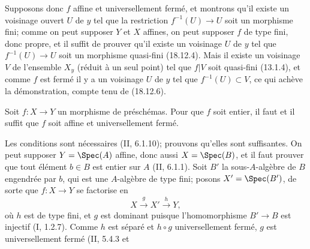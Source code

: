 Supposons donc $f$ affine et universellement fermé, et montrons qu'il existe un voisinage ouvert $U$ de $y$ tel que la restriction $f^{-1}(U)\to U$ soit un morphisme fini; comme on peut supposer $Y$ et $X$ affines, on peut supposer $f$ de type fini, donc propre, et il suffit de prouver qu'il existe un voisinage $U$ de $y$ tel que $f^{-1}(U)\to U$ soit un morphisme quasi-fini (18.12.4). Mais il existe un voisinage $V$ de l'ensemble $X_y$ (réduit à un seul point) tel que $f|V$ soit quasi-fini (13.1.4), et comme $f$ est fermé il y a un voisinage $U$ de $y$ tel que $f^{-1}(U)\subset V$, ce qui achève la démonstration, compte tenu de (18.12.6).

\begin{proposition}[18.12.8]
\label{IV.18.12.8}
Soit $f:X\to Y$ un morphisme de préschémas. Pour que $f$ soit entier, il faut et il suffit que $f$ soit affine et universellement fermé.
\end{proposition}

Les conditions sont nécessaires (II, 6.1.10); prouvons qu'elles sont suffisantes. On peut supposer $Y=\Spec(A)$ affine, donc aussi $X=\Spec(B)$, et il faut prouver que tout élément $b\in B$ est entier sur $A$ (II, 6.1.1). Soit $B'$ la sous-$A$-algèbre de $B$ engendrée par $b$, qui est une $A$-algèbre de type fini; posons $X'=\Spec(B')$, de sorte que $f:X\to Y$ se factorise en
\[
  X\xrightarrow{g}X'\xrightarrow{h}Y,
\]
où $h$ est de type fini, et $g$ est dominant puisque l'homomorphisme $B'\to B$ est injectif (I, 1.2.7). Comme $h$ est séparé et $h\circ g$ universellement fermé, $g$ est universellement fermé (II, 5.4.3 et


